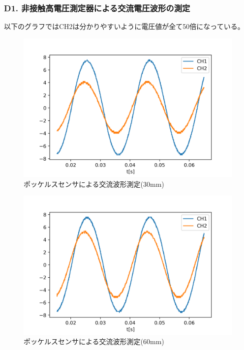 \documentclass[dvipdfmx, twocolumn]{jsarticle}
\begin{document}
\subsubsection*{D1. 非接触高電圧測定器による交流電圧波形の測定}

以下のグラフではCH2は分かりやすいように電圧値が全て50倍になっている。

\begin{figure}[H]
\begin{center}
\includegraphics[scale = 0.5]{D11.png}
\caption{ポッケルスセンサによる交流波形測定(30mm)}
\end{center}
\end{figure}

\begin{figure}[H]
\begin{center}
\includegraphics[scale = 0.5]{D12.png}
\caption{ポッケルスセンサによる交流波形測定(60mm)}
\end{center}
\end{figure}
\end{document}
